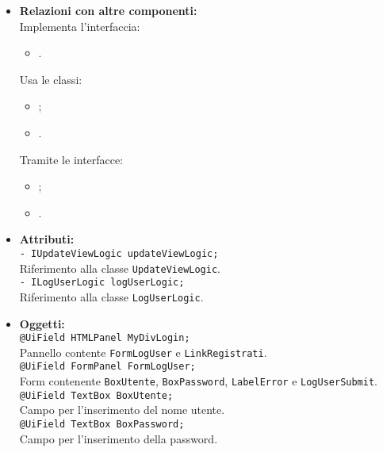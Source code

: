 {\begin{sloppypar}
{\begin{itemize}
\begin{itemize}
			\item[] \textbf{Relazioni con altre componenti:}\\
				Implementa l'interfaccia:
				\begin{itemize}
					\item[] . 
				\end{itemize}
				Usa le classi:
				\begin{itemize}
					\item[] ;
					\item[] .
				\end{itemize}
				Tramite le interfacce:
				\begin{itemize}
					\item[] ; 
					\item[] .
				\end{itemize}

			\item[] \textbf{Attributi:}\\
				\texttt{- IUpdateViewLogic updateViewLogic;}\\
				Riferimento alla classe \texttt{UpdateViewLogic}.\\
				
				\texttt{- ILogUserLogic logUserLogic;}\\
				Riferimento alla classe \texttt{LogUserLogic}.\\

			\item[] \textbf{Oggetti:}\\
				\texttt{@UiField HTMLPanel MyDivLogin;}\\
				Pannello contente \texttt{FormLogUser} e \texttt{LinkRegistrati}.\\
				
				\texttt{@UiField FormPanel FormLogUser;}\\
				Form contenente \texttt{BoxUtente}, \texttt{BoxPassword}, \texttt{LabelError} e \texttt{LogUserSubmit}.\\
				
				\texttt{@UiField TextBox BoxUtente;}\\
				Campo per l'inserimento del nome utente.\\
				
				\texttt{@UiField TextBox BoxPassword;}\\
				Campo per l'inserimento della password.\\
				

\end{itemize}
\end{itemize}}
\end{sloppypar}}
